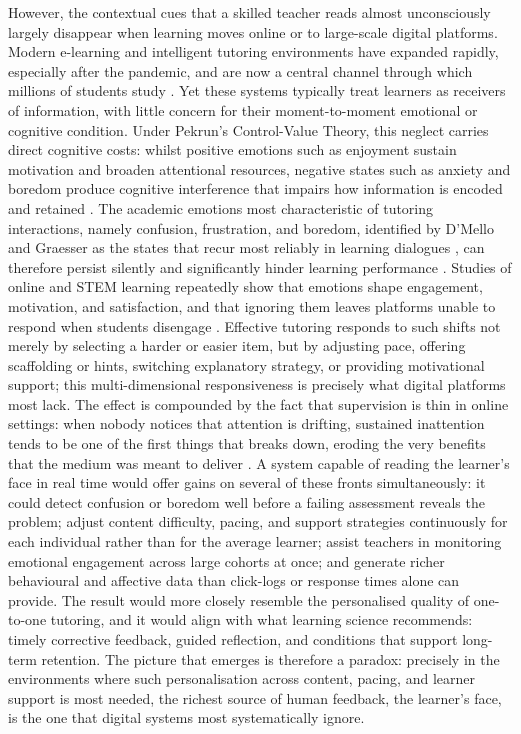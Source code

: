 However, the contextual cues that a skilled teacher reads almost unconsciously largely disappear when learning moves online or to large-scale digital platforms. Modern e-learning and intelligent tutoring environments have expanded rapidly, especially after the pandemic, and are now a central channel through which millions of students study \cite{strielkowski_span_2025}. Yet these systems typically treat learners as receivers of information, with little concern for their moment-to-moment emotional or cognitive condition. Under Pekrun's Control-Value Theory, this neglect carries direct cognitive costs: whilst positive emotions such as enjoyment sustain motivation and broaden attentional resources, negative states such as anxiety and boredom produce cognitive interference that impairs how information is encoded and retained \cite{pekrun_control-value_2006}. The academic emotions most characteristic of tutoring interactions, namely confusion, frustration, and boredom, identified by D'Mello and Graesser as the states that recur most reliably in learning dialogues \cite{dmello_language_2012}, can therefore persist silently and significantly hinder learning performance \cite{gong_design_2025}. Studies of online and STEM learning repeatedly show that emotions shape engagement, motivation, and satisfaction, and that ignoring them leaves platforms unable to respond when students disengage \cite{anwar_emotions_2023}. Effective tutoring responds to such shifts not merely by selecting a harder or easier item, but by adjusting pace, offering scaffolding or hints, switching explanatory strategy, or providing motivational support; this multi-dimensional responsiveness is precisely what digital platforms most lack. The effect is compounded by the fact that supervision is thin in online settings: when nobody notices that attention is drifting, sustained inattention tends to be one of the first things that breaks down, eroding the very benefits that the medium was meant to deliver \cite{gupta_edfa_2023,aly_enhancing_2023}. A system capable of reading the learner's face in real time would offer gains on several of these fronts simultaneously: it could detect confusion or boredom well before a failing assessment reveals the problem; adjust content difficulty, pacing, and support strategies continuously for each individual rather than for the average learner; assist teachers in monitoring emotional engagement across large cohorts at once; and generate richer behavioural and affective data than click-logs or response times alone can provide. The result would more closely resemble the personalised quality of one-to-one tutoring, and it would align with what learning science recommends: timely corrective feedback, guided reflection, and conditions that support long-term retention. The picture that emerges is therefore a paradox: precisely in the environments where such personalisation across content, pacing, and learner support is most needed, the richest source of human feedback, the learner's face, is the one that digital systems most systematically ignore.

